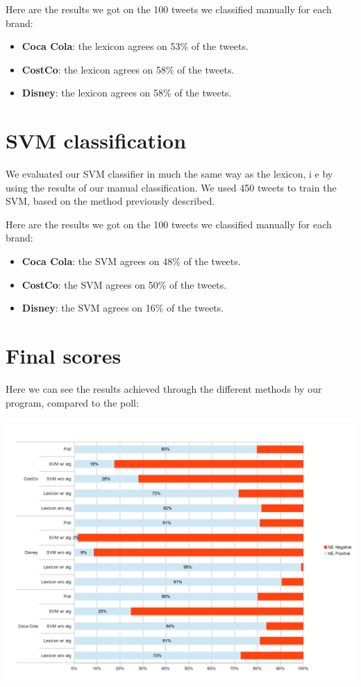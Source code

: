 \documentclass[a4paper,12pt]{report}
\begin{document}
Here are the results we got on the 100 tweets we classified manually for each brand:
\begin{itemize}
        \item \textbf{Coca Cola}: the lexicon agrees on 53\% of the tweets.
        \item \textbf{CostCo}: the lexicon agrees on 58\% of the tweets.
        \item \textbf{Disney}: the lexicon agrees on 58\% of the tweets.
\end{itemize}

\section{SVM classification}

We evaluated our SVM classifier in much the same way as the lexicon, i e by using the results of our manual classification.
We used 450 tweets to train the SVM, based on the method previously described.

Here are the results we got on the 100 tweets we classified manually for each brand:
\begin{itemize}
        \item \textbf{Coca Cola}: the SVM agrees on 48\% of the tweets.
        \item \textbf{CostCo}: the SVM agrees on 50\% of the tweets.
        \item \textbf{Disney}: the SVM agrees on 16\% of the tweets.
\end{itemize}

\section{Final scores}
Here we can see the results achieved through the different methods by our program, compared to the poll:

\vspace{-0.6cm}
\centerline{\includegraphics[scale=0.45]{../img/full1.png}}
\vspace{-0.6cm}
\end{document}
